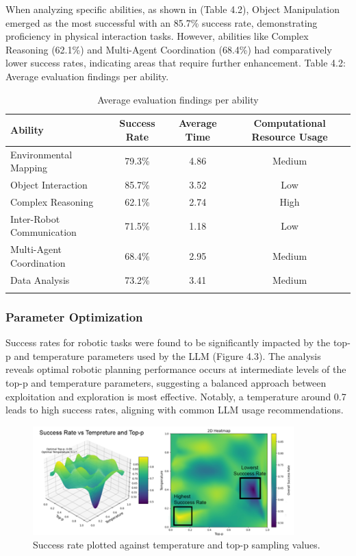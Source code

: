 \documentclass[pdflatex,sn-mathphys-num]{sn-jnl}%
\theoremstyle{thmstyleone}%
\theoremstyle{thmstyletwo}%
\theoremstyle{thmstylethree}%
\begin{document}
When analyzing specific abilities, as shown in (Table 4.2), Object Manipulation emerged as the most successful with an 85.7\% success rate, demonstrating proficiency in physical interaction tasks. However, abilities like Complex Reasoning (62.1\%) and Multi-Agent Coordination (68.4\%) had comparatively lower success rates, indicating areas that require further enhancement.
Table 4.2: Average evaluation findings per ability.
\begin{table}[h]
\caption{Average evaluation findings per ability}\label{tab2}
\begin{tabular*}{\textwidth}{@{\extracolsep\fill}lccc}
\toprule
Ability & Success Rate & Average Time & Computational Resource Usage \\
\midrule
Environmental Mapping & 79.3\% & 4.86 & Medium \\
Object Interaction & 85.7\% & 3.52 & Low \\
Complex Reasoning & 62.1\% & 2.74 & High \\
Inter-Robot Communication & 71.5\% & 1.18 & Low \\
Multi-Agent Coordination & 68.4\% & 2.95 & Medium \\
Data Analysis & 73.2\% & 3.41 & Medium \\
\botrule
\end{tabular*}
\end{table}
\subsubsection{Parameter Optimization}
Success rates for robotic tasks were found to be significantly impacted by the top-p and temperature parameters used by the LLM (Figure 4.3).
The analysis reveals optimal robotic planning performance occurs at intermediate levels of the top-p and temperature parameters, suggesting a balanced approach between exploitation and exploration is most effective. Notably, a temperature around 0.7 leads to high success rates, aligning with common LLM usage recommendations.
\begin{figure}[H]
\centering
\includegraphics[width=0.9\textwidth]{figures/Picture1.png}
\caption{Success rate plotted against temperature and top-p sampling values.}\label{fig11}
\end{figure}
\end{document}
